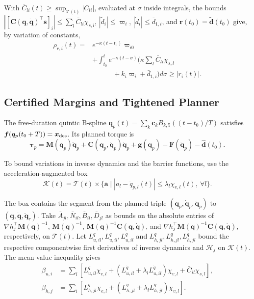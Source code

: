With $\bar C_{li}(t)\ge\sup_{\mathcal T(t)}|C_{li}|$, evaluated at $\sigma$ inside integrals, the bounds $|[\bm C(\bm q,\dot{\bm q})^\top\bm s]_i|\le\sum_l\bar C_{li}\chi_{s,l}$, $|\tilde d_i|\le\varpi_i$, $|\dot d_i|\le\bar d_{1,i}$, and $\bm r(t_0)=\tilde{\bm d}(t_0)$ give, by variation of constants,
\begin{equation}
\begin{aligned}
\rho_{r,i}(t)={}&e^{-\kappa(t-t_0)}\varpi_{i0}\\
&+\int_{t_0}^{t}e^{-\kappa(t-\sigma)}
\bigg(\kappa\sum_l\bar C_{li}\chi_{s,l}\\
&\qquad\quad+k_i\varpi_i+\bar d_{1,i}\bigg)d\sigma
\ge|r_i(t)|.
\end{aligned}
\label{eq_res_bound}
\end{equation}

\subsection{Certified Margins and Tightened Planner}

The free-duration quintic B-spline $\bm q_p(t)=\sum_k\bm c_kB_{k,5}((t-t_0)/T)$ satisfies $\bm f(\bm q_p(t_0+T))=\bm x_{\rm des}$. Its planned torque is
\begin{equation}
\bm\tau_p=\bm M(\bm q_p)\ddot{\bm q}_p
+\bm C(\bm q_p,\dot{\bm q}_p)\dot{\bm q}_p
+\bm g(\bm q_p)+\bm F(\dot{\bm q}_p)-\hat{\bm d}(t_0).
\label{eq_tau_p}
\end{equation}

To bound variations in inverse dynamics and the barrier functions, use the acceleration-augmented box
\[
\mathcal K(t)=\mathcal T(t)\times
\{\bm a\mid|a_l-\ddot q_{p,l}(t)|\le\lambda_l\chi_{v,l}(t),\ \forall l\}.
\]

The box contains the segment from the planned triple $(\bm q_p,\dot{\bm q}_p,\ddot{\bm q}_p)$ to $(\bm q,\dot{\bm q},\ddot{\bm q}_r)$. Take $\bar A_{jl},\bar N_{il},\bar B_{il},\bar D_{jl}$ as bounds on the absolute entries of $\nabla h_j^\top\bm M(\bm q)^{-1}$, $\bm M(\bm q)^{-1}$, $\bm M(\bm q)^{-1}\bm C(\bm q,\dot{\bm q})$, and $\nabla h_j^\top\bm M(\bm q)^{-1}\bm C(\bm q,\dot{\bm q})$, respectively, on $\mathcal T(t)$. Let $L^q_{u,il},L^{\dot q}_{u,il},L^{\ddot q}_{u,il}$ and $L^q_{h,jl},L^{\dot q}_{h,jl},L^{\ddot q}_{h,jl}$ bound the respective componentwise first derivatives of inverse dynamics and $\mathcal H_j$ on $\mathcal K(t)$. The mean-value inequality gives
\begin{equation}
\begin{aligned}
\beta_{u,i}&=\sum_l\left[L^q_{u,il}\chi_{e,l}
+(L^{\dot q}_{u,il}+\lambda_lL^{\ddot q}_{u,il})\chi_{v,l}
+\bar C_{il}\chi_{s,l}\right],\\
\beta_{h,j}&=\sum_l\left[L^q_{h,jl}\chi_{e,l}
+(L^{\dot q}_{h,jl}+\lambda_lL^{\ddot q}_{h,jl})\chi_{v,l}\right].
\end{aligned}
\label{eq_beta_bounds}
\end{equation}

